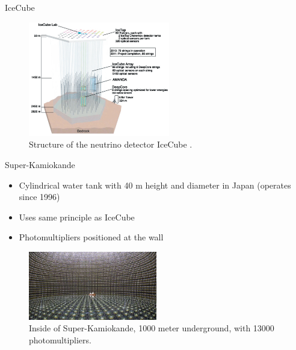 \documentclass[aspectratio=1610, 10pt]{beamer}
\begin{document}
\begin{frame}{IceCube}
  \begin{figure}
    \includegraphics[width=0.55\textwidth]{images/icecube.png}
    \caption{Structure of the neutrino detector IceCube \cite{neutrino}.}
  \end{figure}
\end{frame}


\begin{frame}{Super-Kamiokande}
  \begin{itemize}
    \item Cylindrical water tank with 40 m height and diameter in Japan (operates since 1996)
    \medskip
    \item Uses same principle as IceCube
    \medskip
    \item Photomultipliers positioned at the wall
  \end{itemize}
  \begin{figure}
    \includegraphics[width=0.5\textwidth]{images/kamiokande.png}
    \caption{Inside of Super-Kamiokande, 1000 meter underground, with 13000 photomultipliers.}
  \end{figure}
\end{frame}
\end{document}
